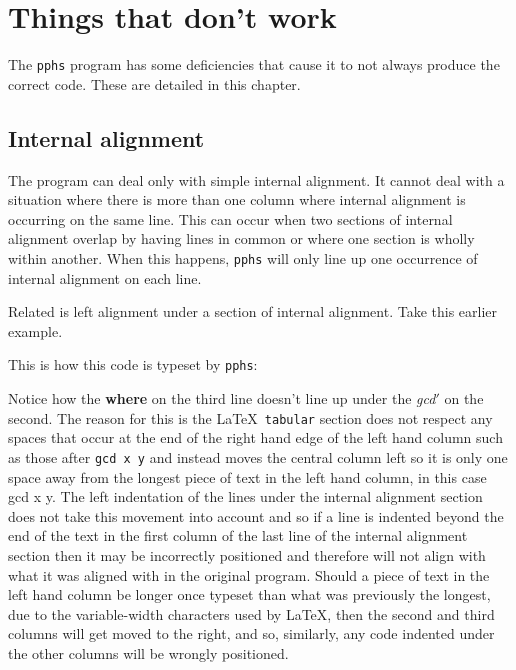 \chapter{Things that don't work} \label{faults}

The {\tt pphs} program has some deficiencies that cause it to not always produce the
correct code.  These are detailed in this chapter.

\section{Internal alignment}

The program can deal only with simple internal alignment.  It cannot deal with a
situation where there is more than one column where internal alignment is occurring
on the same line.  This can occur when two sections of internal
alignment overlap by having lines in common or where one section is wholly within another.
When this happens, {\tt pphs} will only
line up one occurrence of internal alignment on each line.

Related is left alignment under a section of internal alignment.  Take this earlier example.
\begin{quote}

\end{quote}
This is how this code is typeset by {\tt pphs}:
\begin{quote}

\end{quote}
Notice how the {\bf where} on the third line doesn't line up under the {\it gcd\/}$'$ on
the second.  The reason for this
is the \LaTeX\ {\tt tabular} section does not respect any spaces that occur at the end
of the right hand edge of the left hand column such as those after
{\tt gcd x y} and instead moves the central column left
so it is only one space away from the longest piece of text in the left hand column,
in this case {\iden gcd\/} {\iden x\/} {\iden y\/}.
The left indentation of the lines under the internal alignment section does not take this
movement into account and so if a line is indented beyond the end of the text in the first
column of the last line of the internal alignment section then it may be incorrectly
positioned and therefore will not align with what it was aligned with in the original
program.  Should a piece of text in the left hand column be longer once typeset than what was
previously the longest, due to the variable-width characters used by \LaTeX ,
then the second and third columns will get moved to the right, and so, similarly,
any code indented under the other columns will be wrongly positioned.

